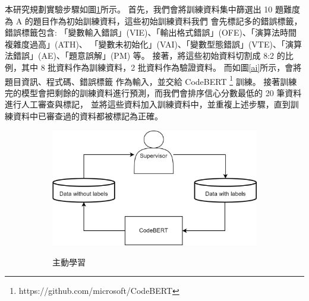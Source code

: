 \documentclass[12pt]{article}
\begin{document}
\begin{enumerate}
\begin{enumerate}
\begin{enumerate}[label=(\arabic*)]
              \par 本研究規劃實驗步驟如圖\ref{ai2}所示。
              首先，我們會將訓練資料集中篩選出 10 題難度為 A 的題目作為初始訓練資料，這些初始訓練資料我們
              會先標記多的錯誤標籤，錯誤標籤包含: 「變數輸入錯誤」(VIE)、「輸出格式錯誤」(OFE)、「演算法時間複雜度過高」(ATH)、
              「變數未初始化」(VAI)、「變數型態錯誤」(VTE)、「演算法錯誤」(AE)、「題意誤解」(PM) 等。
              接著，將這些初始資料切割成 8:2 的比例，其中 8 批資料作為訓練資料，2 批資料作為驗證資料。
              而如圖\ref{ai}所示，會將 題目資訊、程式碼、錯誤標籤 作為輸入，並交給 CodeBERT \footnote{https://github.com/microsoft/CodeBERT} 訓練。
              接著訓練完的模型會把剩餘的訓練資料進行預測，而我們會排序信心分數最低的 20 筆資料進行人工審查與標記，
              並將這些資料加入訓練資料中，並重複上述步驟，直到訓練資料中已審查過的資料都被標記為正確。
              \begin{figure}[H]
                \centering
                \begin{subfigure}{0.3\linewidth}
                  \centering
                  \href{https://raw.githubusercontent.com/programingtw/proglearn-plan/main/img/ai2.jpg}{
                    \includegraphics[width=\textwidth]{./img/ai2.jpg}
                  }
                  \caption{主動學習}
                  \label{ai2}
                \end{subfigure}
                \begin{subfigure}{0.3\linewidth}
                  \centering
                  \href{https://raw.githubusercontent.com/programingtw/proglearn-plan/main/img/ai.jpg}{
}
\end{subfigure}
\end{figure}
\end{enumerate}
\end{enumerate}
\end{enumerate}
\end{document}
